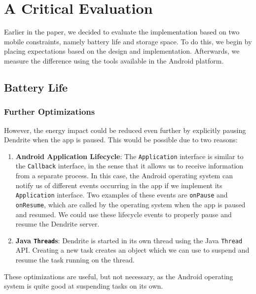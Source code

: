 \chapter{A Critical Evaluation}\label{chp:a_critical_evaluation}
Earlier in the paper, we decided to evaluate the implementation based on two mobile constraints, namely battery life and storage space.
To do this, we begin by placing expectations based on the design and implementation.
Afterwards, we measure the difference using the tools available in the Android platform.

\section{Battery Life}\label{sec:battery_life}

\subsection{Further Optimizations}
However, the energy impact could be reduced even further by explicitly pausing Dendrite when the app is paused.
This would be possible due to two reasons:
\begin{enumerate}
	\item{
	      \textbf{Android Application Lifecycle}:
	      The \texttt{Application} interface is similar to the \texttt{Callback} interface, in the sense that it allows us to receive information from a separate process.
	      In this case, the Android operating system can notify us of different events occurring in the app if we implement its \texttt{Application} interface.
	      Two examples of these events are \texttt{onPause} and \texttt{onResume}, which are called by the operating system when the app is paused and resumed.
	      We could use these lifecycle events to properly pause and resume the Dendrite server.
	      }
	\item{
	      \textbf{Java \texttt{Thread}s}:
	      Dendrite is started in its own thread using the Java \texttt{Thread} \ac{API}\@.
	      Creating a new task creates an object which we can use to suspend and resume the task running on the thread.
	      }
\end{enumerate}

These optimizations are useful, but not necessary, as the Android operating system is quite good at suspending tasks on its own.

